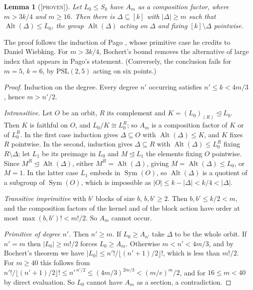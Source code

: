 \documentclass[11pt]{article}
\newtheorem{lemma}[theorem]{Lemma}
\theoremstyle{definition}
\theoremstyle{remark}
\newcommand{\Sym}{\operatorname{Sym}}
\newcommand{\Alt}{\operatorname{Alt}}
\newcommand{\Proven}{\textsc{[proven]}}
\begin{document}
\begin{lemma}[\Proven]\label{lem:A}
Let $L_0\le S_k$ have $A_m$ as a composition factor, where $m>3k/4$ and $m\ge16$. Then there is $\Delta\subseteq[k]$ with $|\Delta|\ge m$ such that $\Alt(\Delta)\le L_0$, the group $\Alt(\Delta)$ acting on $\Delta$ and fixing $[k]\setminus\Delta$ pointwise.
\end{lemma}

The proof follows the induction of Pago \cite[Lemma~\texttt{G\_groupInduction}]{Pago23}, whose primitive case he credits to Daniel Wiebking. For $m>3k/4$, Bochert's bound removes the alternative of large index that appears in Pago's statement. (Conversely, the conclusion fails for $m=5$, $k=6$, by $\mathrm{PSL}(2,5)$ acting on six points.)

\begin{proof}
Induction on the degree. Every degree $n'$ occurring satisfies $n'\le k<4m/3$, hence $m>n'/2$.

\emph{Intransitive.} Let $O$ be an orbit, $R$ its complement and $K=(L_0)_{(R)}\trianglelefteq L_0$. Then $K$ is faithful on $O$, and $L_0/K\cong L_0^R$; so $A_m$ is a composition factor of $K$ or of $L_0^R$. In the first case induction gives $\Delta\subseteq O$ with $\Alt(\Delta)\le K$, and $K$ fixes $R$ pointwise. In the second, induction gives $\Delta\subseteq R$ with $\Alt(\Delta)\le L_0^R$ fixing $R\setminus\Delta$; let $L_1$ be its preimage in $L_0$ and $M\trianglelefteq L_1$ the elements fixing $O$ pointwise. Since $M^R\trianglelefteq\Alt(\Delta)$, either $M^R=\Alt(\Delta)$, giving $M=\Alt(\Delta)\le L_0$, or $M=1$. In the latter case $L_1$ embeds in $\Sym(O)$, so $\Alt(\Delta)$ is a quotient of a subgroup of $\Sym(O)$, which is impossible as $|O|\le k-|\Delta|<k/4<|\Delta|$.

\emph{Transitive imprimitive} with $b'$ blocks of size $b$, $b,b'\ge 2$. Then $b,b'\le k/2<m$, and the composition factors of the kernel and of the block action have order at most $\max(b,b')!<m!/2$. So $A_m$ cannot occur.

\emph{Primitive of degree $n'$.} Then $n'\ge m$. If $L_0\ge A_{n'}$ take $\Delta$ to be the whole orbit. If $n'=m$ then $|L_0|\ge m!/2$ forces $L_0\ge A_m$. Otherwise $m<n'<4m/3$, and by Bochert's theorem \cite[Thm~3.3B]{DM96} we have $|L_0|\le n'!/\lfloor(n'+1)/2\rfloor!$, which is less than $m!/2$. For $m\ge40$ this follows from $n'!/\lfloor(n'+1)/2\rfloor!\le n'^{\,n'/2}\le(4m/3)^{2m/3}<(m/e)^m/2$, and for $16\le m<40$ by direct evaluation. So $L_0$ cannot have $A_m$ as a section, a contradiction.
\end{proof}
\end{document}
